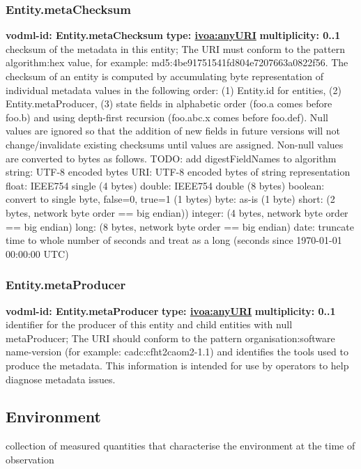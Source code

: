     \subsubsection{Entity.metaChecksum}
      \textbf{vodml-id: Entity.metaChecksum} \newline
      \textbf{type: \hyperref[sect:ivoa]{ivoa:anyURI}} \newline
      \textbf{multiplicity: 0..1} \newline
      checksum of the metadata in this entity; The URI must conform to the pattern {algorithm}:{hex value}, for example: md5:4be91751541fd804e7207663a0822f56. The checksum of an entity is computed by accumulating byte representation of individual metadata values in the following order: (1) Entity.id for entities, (2) Entity.metaProducer, (3) state fields in alphabetic order (foo.a comes before foo.b) and using depth-first recursion (foo.abc.x comes before foo.def). Null values are ignored so that the addition of new fields in future versions will not change/invalidate existing checksums until values are assigned. Non-null values are converted to bytes as follows. TODO: add digestFieldNames to algorithm string: UTF-8 encoded bytes URI: UTF-8 encoded bytes of string representation float: IEEE754 single (4 bytes) double: IEEE754 double (8 bytes) boolean: convert to single byte, false=0, true=1 (1 bytes) byte: as-is (1 byte) short: (2 bytes, network byte order == big endian)) integer: (4 bytes, network byte order == big endian) long: (8 bytes, network byte order == big endian) date: truncate time to whole number of seconds and treat as a long (seconds since 1970-01-01 00:00:00 UTC)

    \subsubsection{Entity.metaProducer}
      \textbf{vodml-id: Entity.metaProducer} \newline
      \textbf{type: \hyperref[sect:ivoa]{ivoa:anyURI}} \newline
      \textbf{multiplicity: 0..1} \newline
      identifier for the producer of this entity and child entities with null metaProducer; The URI should conform to the pattern {organisation}:{software name-version} (for example: cadc:cfht2caom2-1.1) and identifies the tools used to produce the metadata. This information is intended for use by operators to help diagnose metadata issues.

  \subsection{Environment}
  \label{sect:Environment}
    collection of measured quantities that characterise the environment at the time of observation

